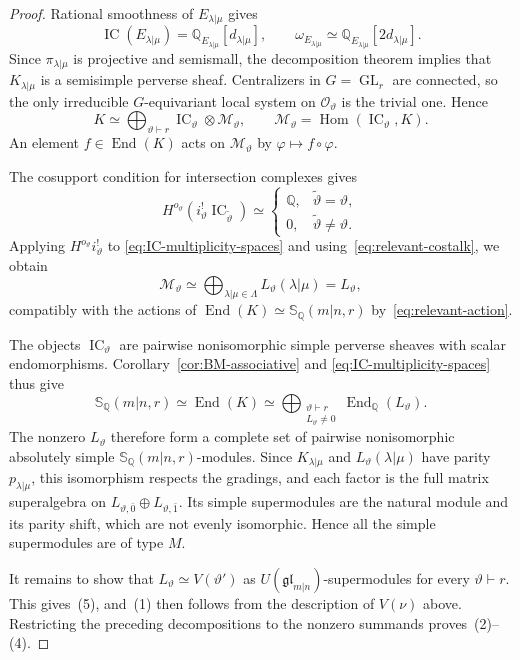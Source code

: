 \documentclass[11pt,a4paper]{amsart}
\theoremstyle{definition}
\theoremstyle{remark}
\newcommand{\Q}{\mathbb Q}
\newcommand{\bS}{\mathbb S}
\newcommand{\IC}{\operatorname{IC}}
\newcommand{\End}{\operatorname{End}}
\newcommand{\Hom}{\operatorname{Hom}}
\newcommand{\lm}{\lambda|\mu}
\numberwithin{equation}{section}
\begin{document}
\begin{proof}
Rational smoothness of $E_{\lm}$ gives
$$
\IC(E_{\lm})=\Q_{E_{\lm}}[d_{\lm}],\qquad
\omega_{E_{\lm}}\simeq\Q_{E_{\lm}}[2d_{\lm}].
$$
Since $\pi_{\lm}$ is projective and semismall, the decomposition
theorem implies that $K_{\lm}$ is a semisimple perverse sheaf.
Centralizers in $G=\operatorname{GL}_r$ are connected, so the only irreducible
$G$-equivariant local system on $\mathcal O_\vartheta$ is the trivial one.
Hence
\begin{equation}\label{eq:IC-multiplicity-spaces}
K\simeq\bigoplus_{\vartheta\vdash r}\IC_\vartheta\otimes\mathcal M_\vartheta,
\qquad \mathcal M_\vartheta=\Hom(\IC_\vartheta,K).
\end{equation}
An element $f\in\End(K)$ acts on $\mathcal M_\vartheta$ by
$\varphi\mapsto f\circ\varphi$.

The cosupport condition for intersection complexes gives
$$
H^{o_\vartheta}(i_\vartheta^!\IC_{\tilde\vartheta})
\simeq
\begin{cases}
\Q,&\tilde\vartheta=\vartheta,\\
0,&\tilde\vartheta\ne\vartheta.
\end{cases}
$$
Applying $H^{o_\vartheta}i_\vartheta^!$ to
\eqref{eq:IC-multiplicity-spaces} and using~\eqref{eq:relevant-costalk},
we obtain
$$
\mathcal M_\vartheta\simeq
\bigoplus_{\lm\in\Lambda}L_\vartheta(\lm)
=L_\vartheta,
$$
compatibly with the actions of $\End(K)\simeq\bS_\Q(m|n,r)$
by~\eqref{eq:relevant-action}.

The objects $\IC_\vartheta$ are pairwise nonisomorphic simple
perverse sheaves with scalar endomorphisms. Corollary~\ref{cor:BM-associative}
and \eqref{eq:IC-multiplicity-spaces} thus give
$$
\bS_\Q(m|n,r)\simeq\End(K)
\simeq\bigoplus_{\substack{\vartheta\vdash r\\
 L_\vartheta\ne0}}
\End_\Q(L_\vartheta).
$$
The nonzero $L_\vartheta$ therefore form a complete set of pairwise
nonisomorphic absolutely simple $\bS_\Q(m|n,r)$-modules. Since $K_{\lm}$
and $L_\vartheta(\lm)$ have parity $p_{\lm}$, this isomorphism respects
the gradings, and each factor is the full matrix superalgebra on
$L_{\vartheta,\bar0}\oplus L_{\vartheta,\bar1}$.
Its simple supermodules are the natural module and its parity shift,
which are not evenly isomorphic. Hence all the simple supermodules
are of type $M$.

It remains to show that $L_\vartheta\simeq V(\vartheta')$ as
$U(\mathfrak{gl}_{m|n})$-supermodules for every $\vartheta\vdash r$.
This gives~(5), and~(1) then follows from the description of $V(\nu)$
above. Restricting the preceding decompositions to the nonzero summands
proves~(2)--(4).


\end{proof}
\end{document}
